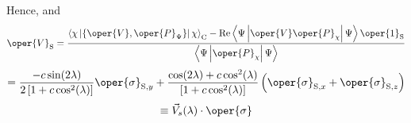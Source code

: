 Hence,
and
\begin{equation}
\oper{V}_{\mathrm{S}}=\frac{\left\langle\chi\left|\left\{\oper{V}, \oper{P}_{\Psi}\right\}\right| \chi\right\rangle_{\mathrm{C}}-\operatorname{Re}\left\langle\Psi\left|\oper{V} \oper{P}_\chi\right| \Psi\right\rangle \oper{1}_{\mathrm{S}}}{\left\langle\Psi\left|\oper{P}_\chi\right| \Psi\right\rangle}
\end{equation}
\begin{equation}
=\frac{-c \sin (2 \lambda)}{2\left[1+c \cos ^2(\lambda)\right]} \oper{\sigma}_{\mathrm{S}, y}+\frac{\cos (2 \lambda)+c \cos ^2(\lambda)}{\left[1+c \cos ^2(\lambda)\right]}\left(\oper{\sigma}_{\mathrm{S}, x}+\oper{\sigma}_{\mathrm{S}, z}\right)
\end{equation}
\begin{equation}
\equiv \vec{V}_s(\lambda) \cdot \oper{\sigma}
\end{equation}
